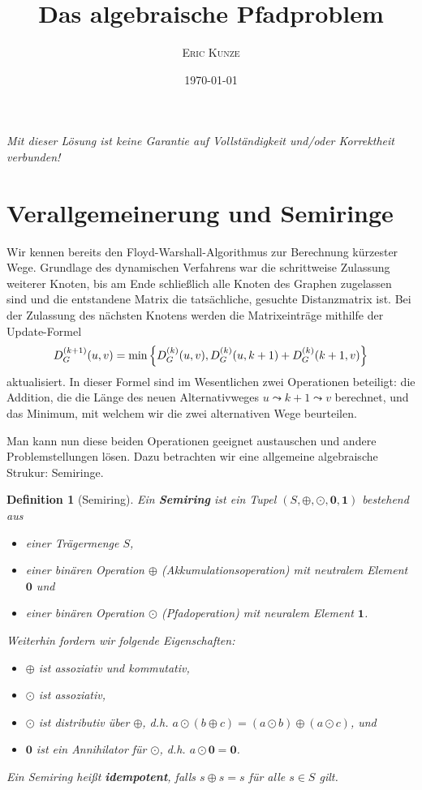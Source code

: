 \documentclass[ngerman, a4paper, 12pt]{article}
\theoremstyle{mystyle}
\newtheorem{definition}{Definition}
\begin{document}
	\title{\bfseries \sffamily \huge Das algebraische Pfadproblem}
	\author{\scshape Eric Kunze}
	\date{\today}
	\maketitle
	{ \footnotesize \doclicenseThis }
	
	\begin{center}
		\small \slshape Mit dieser Lösung ist keine Garantie auf Vollständigkeit und/oder Korrektheit verbunden!
	\end{center}
	
	\section{Verallgemeinerung und Semiringe}
	
	Wir kennen bereits den Floyd-Warshall-Algorithmus zur Berechnung kürzester Wege. Grundlage des dynamischen Verfahrens war die schrittweise Zulassung weiterer Knoten, bis am Ende schließlich alle Knoten des Graphen zugelassen sind und die entstandene Matrix die tatsächliche, gesuchte Distanzmatrix ist. Bei der Zulassung des nächsten Knotens werden die Matrixeinträge mithilfe der Update-Formel 
	\begin{equation*}
		D_G^{(k+1)}(u,v)
		= \min\left\{ D_G^{(k)}(u,v) , 
				D_G^{(k)}(u,k+1) + D_G^{(k)}(k+1,v) \right\}
	\end{equation*}
	aktualisiert. In dieser Formel sind im Wesentlichen zwei Operationen beteiligt: die Addition, die die Länge des neuen Alternativweges $u \leadsto k+1 \leadsto v$ berechnet, und das Minimum, mit welchem wir die zwei alternativen Wege beurteilen.
	
	Man kann nun diese beiden Operationen geeignet austauschen und andere Problemstellungen lösen. 
	Dazu betrachten wir eine allgemeine algebraische Strukur: Semiringe.
	
	\begin{definition}[Semiring]
		Ein \textbf{Semiring} ist ein Tupel $(S, \oplus, \odot, \mathbf{0}, \mathbf{1})$ bestehend aus
		\begin{itemize}
			\item einer Trägermenge $S$,
			\item einer binären Operation $\oplus$ (Akkumulationsoperation) mit neutralem Element $\mathbf{0}$ und
			\item einer binären Operation $\odot$ (Pfadoperation) mit neuralem Element $\mathbf{1}$.
		\end{itemize}
		Weiterhin fordern wir folgende Eigenschaften:
		\begin{itemize}
			\item $\oplus$ ist assoziativ und kommutativ,
			\item $\odot$ ist assoziativ,
			\item $\odot$ ist distributiv über $\oplus$, d.h. $a \odot (b \oplus c) = (a \odot b) \oplus (a \odot c)$, und
			\item $\mathbf{0}$ ist ein Annihilator für $\odot$, d.h. $a \odot \mathbf{0} = \mathbf{0}$.
		\end{itemize}
		Ein Semiring heißt \textbf{idempotent}, falls $s \oplus s = s$ für alle $s \in S$ gilt.
	\end{definition}
\end{document}
